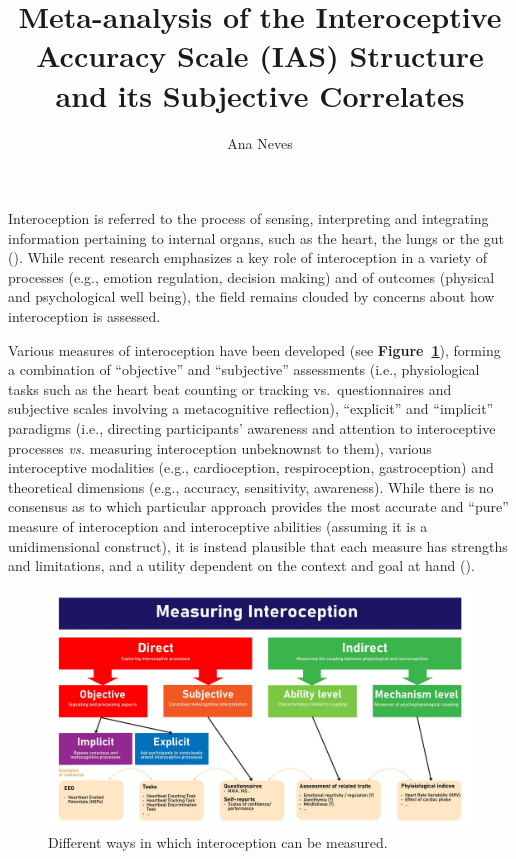 \documentclass[
  man,
  floatsintext,
  longtable,
  nolmodern,
  notxfonts,
  notimes,
  colorlinks=true,linkcolor=blue,citecolor=blue,urlcolor=blue]{apa7}
\title{Meta-analysis of the Interoceptive Accuracy Scale (IAS) Structure
and its Subjective Correlates}
\author{Ana Neves}
\affiliation{
{School of Psychology, University of Sussex}}
\begin{document}
\maketitle


\setcounter{secnumdepth}{-\maxdimen} %

\setlength\LTleft{0pt}

\resetlinenumber[1]

Interoception is referred to the process of sensing, interpreting and
integrating information pertaining to internal organs, such as the
heart, the lungs or the gut (). While recent research emphasizes a key
role of interoception in a variety of processes (e.g., emotion
regulation, decision making) and of outcomes (physical and psychological
well being), the field remains clouded by concerns about how
interoception is assessed.

Various measures of interoception have been developed (see
\textbf{Figure~\ref{fig-measures}}), forming a combination of
``objective'' and ``subjective'' assessments (i.e., physiological tasks
such as the heart beat counting or tracking vs.~questionnaires and
subjective scales involving a metacognitive reflection), ``explicit''
and ``implicit'' paradigms (i.e., directing participants' awareness and
attention to interoceptive processes \emph{vs.} measuring interoception
unbeknownst to them), various interoceptive modalities (e.g.,
cardioception, respiroception, gastroception) and theoretical dimensions
(e.g., accuracy, sensitivity, awareness). While there is no consensus as
to which particular approach provides the most accurate and ``pure''
measure of interoception and interoceptive abilities (assuming it is a
unidimensional construct), it is instead plausible that each measure has
strengths and limitations, and a utility dependent on the context and
goal at hand ().

\begin{figure}[!htbp]

{\caption{{Different ways in which interoception can be
measured.}{\label{fig-measures}}}}

\includegraphics[width=1\textwidth,height=\textheight]{figures/MeasuringInteroception.jpg}

\end{figure}
\end{document}
